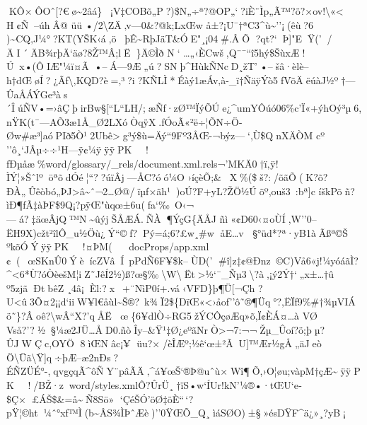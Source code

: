 KÔ×ÔOˆ{[}?€ø\textasciitilde2âá\}¡V‡COBõ„P\textquotesingle?)\$N„÷ª?@\textquotesingle OP„`?iÈ¨Ìp„Ã™?ö?×ov!\textbackslash«\textless
H¢Ñ--úhÂ@ üü •/2\textbackslash ZÄ‚v---0\&?@k;LxŒw
å±?¡U¯†ªC3\^{}ù\textasciitilde''¡(êù?6
)\textasciitilde CQ‚J¼\textquotesingle*°?KT(YŠK‹á‚öþÊ\textasciitilde RþJäT\&ÓE"¸¡04\#.ÂÕ
?qt?{}`Þ{]}"EŸ('/ÄI´ÄB¾rþÄ`äø?8Ž™Â;lË\}Ä©Ìð N`
­\ldots„‹ÈCwš,Q¨¯`` î5hý\$ŠùxÆ\textquotesingle\textquotesingle!Úx•(ÔIÆ"¼ï¤Ã•--Á---9Æ„ú?SNþ\^{}HùkÑNcD¸žT'•--šâ·èlè--h†dŒøÍ?¿Ãf\textbackslash‚KQD?è=‚³?i?KÑLÌ*\textbarÉàý1æÁv‚à-\_ï†ÑäÿÝò5fVõÄëúàJ½º†---ÛaÅÁÝGe³às´ÎúÑV•=›âÇþirBw§{[}``L``LH/;æÑf·zØ™ÏýÕÚe¿\^{}umYÔúó06\%c'Ï«+ýhOý³µ6,nŸK(t¯---AÕ3æ1Å\_Ø2LXóÒqÿX.ƒÓo\textquotesingle Ã«²ë÷¦ÕN÷Ö-Øw\#æ³{]}aóPIð5Ò¹2Ubê\textquotesingle\textgreaterg³ý\$ù=Äý``9Fº3ÅŒ-¬\textbar býz---`,Ù\$QnXÄÒM
cº
''ô¸`JÂµ÷÷¹H---ÿ¢¼ÿ  ÿÿ PK     ! ƒÐµåæ   ­  \%   word/glossary/\_rels/document.xml.rels¬'MKÄ0†ï‚ÿ!ÌÝ¦»ŠˆlºöªõdÓé¦``??úïÂj---ÅC?óó¼O
›íçèÕ;\&X\%(\$š?:/õãÕ(K?õ?ÐÀ„Ûêòbó„ÞJ\textgreater â\textasciitilde ˆ¬2\ldots Ø@/ïµf×ãh¹)oÚ?F+yL?ŽÖ½Úõº,ouš3~:bª{]}c
íškPõñ?ìÐ¶ƒÃ‡àÞF\$9Q¡?pÿŒ"ùqœ±6u(fa`‰~O‹¬---á?‡äœÂjQ™N\textasciitilde ûýjŠÅÆÁ.ÑÀ¶ÝçG\{ÄÅJ
ñì«¢D60‹¤o­ÙÍ,W''0--ËH9X)cžt²îl\textquotesingle Ô\_u½Öù¿Ý``©ƒ?\textbarPý=á;6?£w¸\#w
åE\ldots v §°üd*?ª·yB1àÃßª©Š ºkõÓÝ  ÿÿ PK     ! ¤ÞM(     docProps/app.xml
¢(~                                                                                                                                                                                                                                                                 œSKnÛ0ÝèícZVâÍ~pPdÑ6F¥\$k--ÙD('
\#î{]}z‡¢@Ðnz©C)Vå6«j!¼yóáãÌ?\^{}\textless6*Ù?óÒèešM¦iZ˜JêÍ2½)ß?œ§‰\textbackslash W\textbackslashËt\textgreater½`¯\_Ñµ3\textbackslash?à,¡ý2Ý†`„x±\ldots†û
º5zjãÐtbêZ ¸4â¡Èl:?x~+¨NìP0í+.vá‹VFD\}þ¶Ü{[}¬Çh
?U\textless û3Õ¤2¡¡d`iiW¥l€åùl\textasciitilde Š®?~k¾Ï2\$\{DïŒ«\textless›åof''ô˜®¶Üq°?,ËÏf9\%\#†¾µVIÁö˜\}?Âoê?\textbackslash wÂ``X?'qÅË
œ\{6¥dlÒ÷RG5žÝCÔçøÆq»õ,Ï¢ÈÁ¤\ldots à VØ
Vså?'?½§¼æ2JÜ\ldots ÅD0.ñòÎy--\&Ÿ¹‡Ø¿eºãNrÒ\textgreater¬7:¬¬Žµ\_Ûoí?ö;þµ?Û\textquotesingle JWÇc,OYÖ
8ìŒNâc¡¥ üu?×/èÎÆº;½ê`œ±²ÃU{]}™Ær½gÅ„äJeò
Ö\textbackslash Üã\textbackslash Ÿ{]}q÷þÆ--æ2nÐs?ÉÑZÜÉ°-,qvgçqÃ\^{}ôÑY¨pâÃÄ‚\^{}á¥œŠ\textquotesingle`®Þ@uˆù×Wî¶Õ,›O¦øu;vàpM†çÆ\textasciitilde  ÿÿ PK     ! /BŽ·  z     word/styles.xmlÔ?ÛrÜ¸†ïS•w`ÍUr!kN'¼®•·tŒU`e­\$Ç×£ÁŠ\$\&=å\textasciitildeÑ8Sö»
`ÇéŠ­Ó'öØ‡öÈ``\,`?pŸ¦©ht¼ˆ°xƒ™Ì(b\textasciitilde ÂS¾ÌÞˆÆè)''0ŸŒÕ\_Q¸ìá S ØO)±§»ésDŸF\^{}ä¿»¸?yB¡
